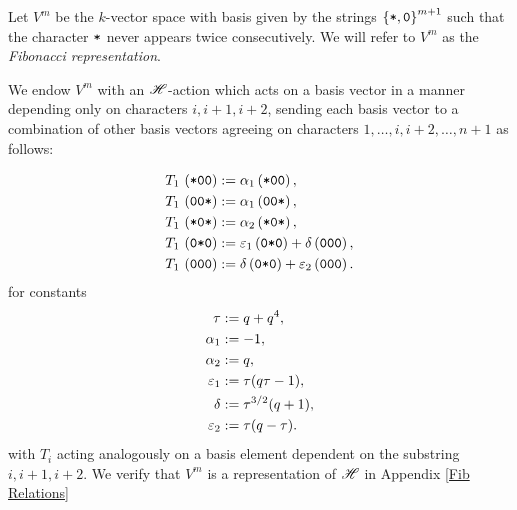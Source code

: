\documentclass{amsart}
\begin{document}
  \begin{definition}\label{Fib definition}
  Let $V^m$ be the $k$-vector space with basis given by the strings $\left\{ \texttt{*},\texttt{0} \right\}^{m+1}$ such that the character $\texttt{*}$ never appears twice consecutively. 
  We will refer to $V^m$ as the \emph{Fibonacci representation}.

  We endow $V^m$ with an $\mathscr{H}$-action which acts on a basis vector in a manner depending only on characters $i,i+1,i+2$, sending each basis vector to a combination of other basis vectors agreeing on characters $1,\dots,i,i+2,\dots,n+1$ as follows:

  \begin{equation} 
    \begin{split}
      T_1 \, \left( \texttt{*}\texttt{0}\texttt{0} \right) &:= \alpha_1\left( \texttt{*}\texttt{0}\texttt{0} \right),\\
      T_1 \, \left( \texttt{0}\texttt{0}\texttt{*} \right) &:= \alpha_1\left( \texttt{0}\texttt{0}\texttt{*} \right),\\
      T_1 \, \left( \texttt{*}\texttt{0}\texttt{*} \right) &:= \alpha_2\left( \texttt{*}\texttt{0}\texttt{*} \right),\\
      T_1 \, \left( \texttt{0}\texttt{*}\texttt{0} \right) &:= \varepsilon_1\left( \texttt{0}\texttt{*}\texttt{0} \right) + \delta\left( \texttt{0}\texttt{0}\texttt{0} \right),\\
      T_1 \, \left( \texttt{0}\texttt{0}\texttt{0} \right) &:= \delta\left( \texttt{0}\texttt{*}\texttt{0} \right) + \varepsilon_2\left( \texttt{0}\texttt{0}\texttt{0} \right).
  \end{split} \label{Fib Action} 
  \end{equation}
  for constants
  \begin{equation}
    \begin{split}
    \tau  &:= q + q^4,\\
    \alpha_1 &:= -1,\\
    \alpha_2 &:= q,\\
    \varepsilon_1 &:= \tau(q\tau - 1),\\
    \delta &:= \tau^{3/2}(q + 1),\\
    \varepsilon_2 &:= \tau(q-\tau).
  \end{split} \label{Fib Constants} 
  \end{equation}
  with $T_i$ acting analogously on a basis element dependent on the substring $i,i+1,i+2$.
  We verify that $V^m$ is a representation of $\mathscr{H}$ in Appendix \ref{Fib Relations}
  \end{definition}
\end{document}
